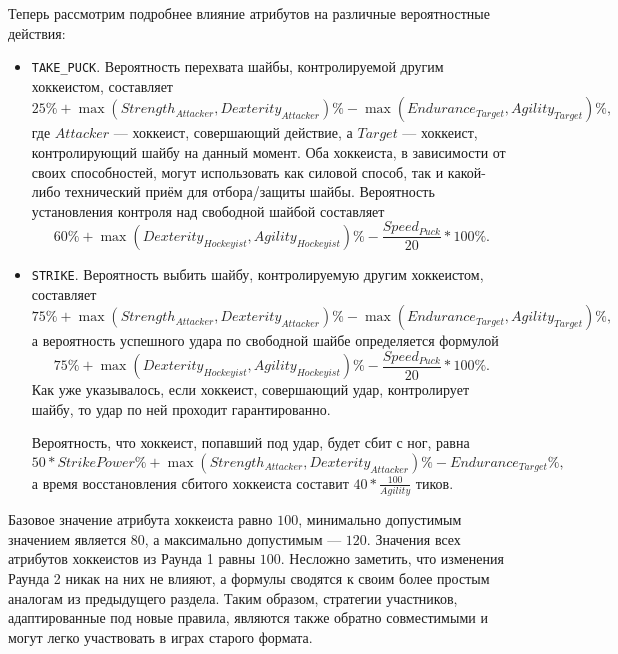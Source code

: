 Теперь рассмотрим подробнее влияние атрибутов на различные вероятностные действия:
\begin{itemize}
  \item \texttt{TAKE\_PUCK}. Вероятность перехвата шайбы, контролируемой другим хоккеистом, составляет
        \begin{equation}
        25\%+\max{(Strength_{Attacker}, Dexterity_{Attacker})}\%-\max{(Endurance_{Target}, Agility_{Target})}\%,
        \end{equation}
        где $Attacker$ --- хоккеист, совершающий действие, а $Target$ --- хоккеист, контролирующий шайбу на данный момент. Оба хоккеиста, в
        зависимости от своих способностей, могут использовать как силовой способ, так и какой-либо технический приём для отбора/защиты
        шайбы. Вероятность установления контроля над свободной шайбой составляет
        \begin{equation}
        60\%+\max{(Dexterity_{Hockeyist}, Agility_{Hockeyist})}\%-\frac{Speed_{Puck}}{20}*100\%.
        \end{equation}
  \item \texttt{STRIKE}. Вероятность выбить шайбу, контролируемую другим хоккеистом, составляет
        \begin{equation}
        75\%+\max{(Strength_{Attacker}, Dexterity_{Attacker})}\%-\max{(Endurance_{Target}, Agility_{Target})}\%,
        \end{equation}
        а вероятность успешного удара по свободной шайбе определяется формулой
        \begin{equation}
        75\%+\max{(Dexterity_{Hockeyist}, Agility_{Hockeyist})}\%-\frac{Speed_{Puck}}{20}*100\%.
        \end{equation}
        Как уже указывалось, если хоккеист, совершающий удар, контролирует шайбу, то удар по ней проходит гарантированно.

        Вероятность, что хоккеист, попавший под удар, будет сбит с ног, равна
        \begin{equation}
        50*StrikePower\%+\max{(Strength_{Attacker}, Dexterity_{Attacker})}\%-Endurance_{Target}\%,
        \end{equation}
        а время восстановления сбитого хоккеиста составит $40*\frac{100}{Agility}$ тиков.
\end{itemize}

Базовое значение атрибута хоккеиста равно $100$, минимально допустимым значением является $80$, а максимально допустимым --- $120$. Значения
всех атрибутов хоккеистов из Раунда 1 равны $100$. Несложно заметить, что изменения Раунда 2 никак на них не влияют, а формулы сводятся к
своим более простым аналогам из предыдущего раздела. Таким образом, стратегии участников, адаптированные под новые правила, являются также
обратно совместимыми и могут легко участвовать в играх старого формата.

